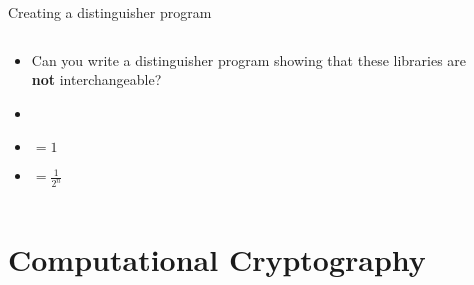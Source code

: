 \documentclass[aspectratio=169, lualatex, handout]{beamer}
\begin{document}
\begin{frame}{Creating a distinguisher program}
	\begin{columns}[c]
		\begin{column}{0.5\textwidth}
			\begin{itemize}[<+->]
				\item Can you write a distinguisher program showing that these libraries are \textbf{not} interchangeable?
				\item {}
				\item {} $= 1$
				\item {} $= \frac{1}{2^n}$
			\end{itemize}
		\end{column}
		\begin{column}{0.5\textwidth}
			\begin{center}
			\end{center}
		\end{column}
	\end{columns}
\end{frame}

\section{Computational Cryptography}
\end{document}
